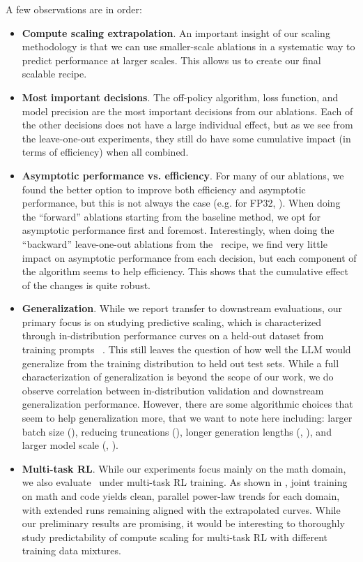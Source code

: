 A few observations are in order:
\begin{itemize}
    \item \textbf{Compute scaling extrapolation}. An important insight of our scaling methodology is that we can use smaller-scale ablations in a systematic way to predict performance at larger scales. This allows us to create our final scalable recipe.
    \item \textbf{Most important decisions}. The off-policy algorithm, loss function, and model precision are the most important decisions from our ablations. Each of the other decisions does not have a large individual effect, but as we see from the leave-one-out experiments, they still do have some cumulative impact (in terms of efficiency) when all combined. 
    \item \textbf{Asymptotic performance vs. efficiency}. For many of our ablations, we found the better option to improve both efficiency and asymptotic performance, but this is not always the case (e.g. for FP32, ). When doing the ``forward'' ablations starting from the baseline method, we opt for asymptotic performance first and foremost. Interestingly, when doing the ``backward'' leave-one-out ablations from the \scalerl\ recipe, we find very little impact on asymptotic performance from each decision, but each component of the algorithm seems to help efficiency. This shows that the cumulative effect of the changes is quite robust.
    \item \textbf{Generalization}. While we report transfer to downstream evaluations, our primary focus is on studying predictive scaling, which is characterized through in-distribution performance curves on a held-out dataset from training prompts ~\citep{misfitting,scalingdataconstrained}.    
    This still leaves the question of how well the LLM would generalize from the training distribution to held out test sets. %
    While a full characterization of generalization is beyond the scope of our work, we do observe correlation between in-distribution validation and downstream generalization performance. However, there are some algorithmic choices that seem to help generalization more, that we want to note here including: larger batch size (), reducing truncations (), longer generation lengths (, ), and larger model scale (, ).

\item \textbf{Multi-task RL}. While our  experiments focus mainly on the math domain, we also evaluate \scalerl\ under multi-task RL training. As shown in , joint training on math and code yields clean, parallel power-law trends for each domain, with extended runs remaining aligned with the extrapolated curves. While our preliminary results are promising, it would be interesting to thoroughly study predictability of compute scaling for multi-task RL with different training data mixtures.
\end{itemize}




